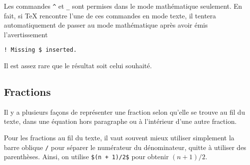 \begin{important}
  Les commandes \verb=^= et \verb=_= sont permises dans le mode
  mathématique seulement. En fait, si {\TeX} rencontre l'une de ces
  commandes en mode texte, il tentera automatiquement de passer au
  mode mathématique après avoir émis l'avertissement
\begin{verbatim}
! Missing $ inserted.
\end{verbatim}
  Il est assez rare que le résultat soit celui souhaité.
\end{important}

\subsection{Fractions}
\label{sec:math:bases:fractions}

Il y a plusieurs façons de représenter une fraction selon qu'elle se
trouve au fil du texte, dans une équation hors paragraphe ou à
l'intérieur d'une autre fraction.

Pour les fractions au fil du texte, il vaut souvent mieux utiliser
simplement la barre oblique \verb=/= pour séparer le numérateur du
dénominateur, quitte à utiliser des parenthèses. Ainsi, on utilise
\verb=$(n + 1)/2$= pour obtenir $(n + 1)/2$.

